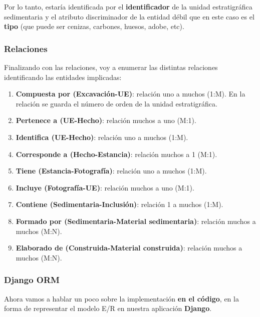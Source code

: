    Por lo tanto, estaría identificada por el \textbf{identificador} de la unidad estratigráfica
    sedimentaria y el atributo discriminador de la entidad débil que en este caso es el
    \textbf{tipo} (que puede ser cenizas, carbones, huesos, adobe, etc).

    \subsubsection{Relaciones}
    Finalizando con las relaciones, voy a enumerar las distintas relaciones identificando las
    entidades implicadas:

        \begin{enumerate}
            \item \textbf{Compuesta por (Excavación-UE)}: relación uno a muchos (1:M). En la
            relación se guarda el número de orden de la unidad estratigráfica.
            \item \textbf{Pertenece a (UE-Hecho)}: relación muchos a uno (M:1).
            \item \textbf{Identifica (UE-Hecho)}: relación uno a muchos (1:M).
            \item \textbf{Corresponde a (Hecho-Estancia)}: relación muchos a 1 (M:1).
            \item \textbf{Tiene (Estancia-Fotografía)}: relación uno a muchos (1:M).
            \item \textbf{Incluye (Fotografía-UE)}: relación muchos a uno (M:1).
            \item \textbf{Contiene (Sedimentaria-Inclusión)}: relación 1 a muchos (1:M).
            \item \textbf{Formado por (Sedimentaria-Material sedimentaria)}: relación muchos a
            muchos (M:N).
            \item \textbf{Elaborado de (Construida-Material construida)}: relación muchos a
            muchos (M:N).
        \end{enumerate}

    \subsubsection{Django ORM}

    Ahora vamos a hablar un poco sobre la implementación \textbf{en el código}, en la forma
    de representar el modelo E/R en nuestra aplicación \textbf{Django}.\\

